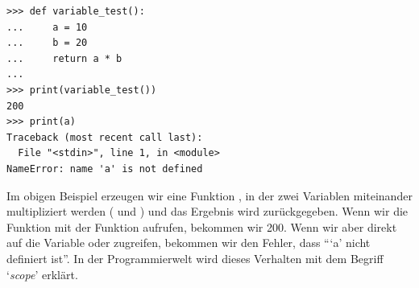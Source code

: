 \begin{Verbatim}[frame=single]
>>> def variable_test():
...     a = 10
...     b = 20
...     return a * b
...
>>> print(variable_test())
200
>>> print(a)
Traceback (most recent call last):
  File "<stdin>", line 1, in <module>
NameError: name 'a' is not defined
\end{Verbatim}

Im obigen Beispiel erzeugen wir eine Funktion , in der zwei Variablen miteinander multipliziert werden ( und ) und das Ergebnis wird zurückgegeben. Wenn wir die Funktion mit der  Funktion aufrufen, bekommen wir 200. Wenn wir aber direkt auf die Variable  oder  zugreifen, bekommen wir den Fehler, dass ```a' nicht definiert ist''. In der Programmierwelt wird dieses Verhalten mit dem Begriff `\emph{scope}' erklärt. 
\par
